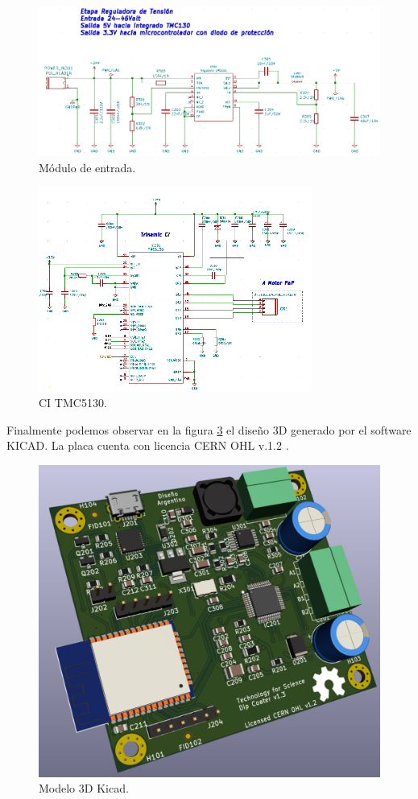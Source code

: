 \begin{figure}[htbp]
	\centering
	\includegraphics[width=.8\textwidth]{./Figures/kicad_tension.png}
	\caption{Módulo de entrada.}
	\label{fig:kicad_tension}
\end{figure}
 
\begin{figure}[htbp]
	\centering
	\includegraphics[width=0.8\textwidth]{./Figures/kicad_trinamic.png}
	\caption{CI TMC5130.}
	\label{fig:kicad_trinamic}
\end{figure} 
 
 
 
 
Finalmente podemos observar en la figura \ref{fig:dip_3d_model} el diseño 3D generado por el software KICAD. La placa cuenta con licencia CERN OHL v.1.2 \citep{web_cern_licence}.


\begin{figure}[htbp]
	\centering
	\includegraphics[width=.5\textwidth]{./Figures/dip_3d_model.pdf}
	\caption{Modelo 3D Kicad.}
	\label{fig:dip_3d_model}
\end{figure}
         



